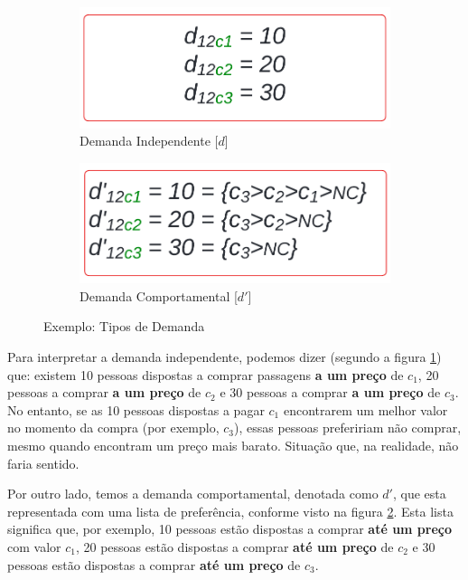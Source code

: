 \begin{figure}[h!]
	\centering
	\begin{subfigure}[b]{0.40\linewidth}
		\includegraphics[width=\linewidth]{img/dem_indepen.png}
		\caption{Demanda Independente [$d$]}
		\label{fig:dem_indepen}
	\end{subfigure}\hspace{5mm}
	\begin{subfigure}[b]{0.40\linewidth}
		\includegraphics[width=\linewidth]{img/dem_compo.png}
		\caption{Demanda Comportamental [$d'$]}
		\label{fig:dem_comporta}
	\end{subfigure}
	\caption{Exemplo: Tipos de Demanda}
	\label{fig: tipos_demanda}
\end{figure}


Para interpretar a demanda independente, podemos dizer (segundo a figura \ref{fig:dem_indepen}) que: existem 10 pessoas dispostas a comprar passagens \textbf{a um preço} de $c_1$, 20 pessoas a comprar \textbf{a um preço} de $c_2$ e 30 pessoas a comprar \textbf{a um preço} de $c_3$. No entanto, se as 10 pessoas dispostas a pagar $c_1$ encontrarem um melhor valor no momento da compra (por exemplo, $c_3$), essas pessoas prefeririam não comprar, mesmo quando encontram um preço mais barato. Situação que, na realidade, não faria sentido.

Por outro lado, temos a demanda comportamental, denotada como $d'$, que esta representada com uma lista de preferência, conforme visto na figura \ref{fig:dem_comporta}. Esta lista significa que, por exemplo, 10 pessoas estão dispostas a comprar \textbf{até um preço} com valor $c_1$, 20 pessoas estão dispostas a comprar \textbf{até um preço} de $c_2$ e 30 pessoas estão dispostas a comprar \textbf{até um preço} de $c_3$.

